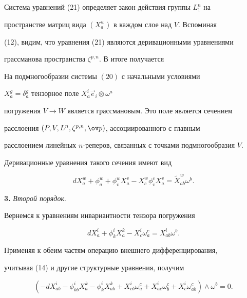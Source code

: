 Система уравнений (21) определяет закон действия группы $L^n_1$ на


пространстве матриц вида $(X^w_a)$ в каждом слое над $V$. Вспоминая


(12), видим, что уравнения (21) являются деривационными уравнениями


грассманова пространства $\zeta^{p,n}$. В итоге получается





\begin{thm} На подмногообразии системы $(20)$ с начальными условиями


$X^g_a = \delta^g_a$ тензорное поле $X^i_a \Vec e_i \otimes \omega^a$


погружения $V \to W$ является грассмановым. Это поле является сечением


расслоения $(P, V, L^n, \zeta^{p,n}, \ov p)$, ассоциированного с главным


расслоением линейных $n$-реперов, связанных с точками подмногообразия $V$.


Деривационные уравнения такого сечения имеют вид


\begin{equation}


dX^w_a + \phi^w_a + \phi^w_v X^v_a - X^w_c \phi^c_v X^v_a =


{\widetilde X}^w_{ab} \omega^b.


\end{equation}


\end{thm}





{\bf 3.} {\it Второй порядок}.


Вернемся к уравнениям инвариантности тензора погружения


$$


dX^i_a + \phi^i_k X^k_a - X^i_c \omega^c_a = X^i_{ab} \omega^b.


$$


Применяя к обеим частям операцию внешнего дифференцирования,


учитывая (14) и другие структурные уравнения, получим


\begin{equation}


(-dX^i_{ab} - \phi^i_{kb} X^k_{a} - \phi^i_k X^k_{ab} +


X^i_{cb} \omega^c_a + X^i_{ac} \omega^c_b + X^i_c \omega^c_{ab})


\wedge \omega^b = 0.


\end{equation}


